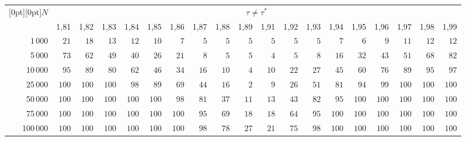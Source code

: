 \begin{table}[b]
\begin{center}
\tabcolsep=3.8pt
\begin{tabular}{|r|r|r|r|r|r|r|r|r|r|r|r|r|r|r|r|r|r|r|}
\hline
\multicolumn{1}{|c|}{\raisebox{-6pt}[0pt][0pt]{$N$}}& \multicolumn{18}{c|}{$\tau\neq\tau^*$} \\
\cline{2-19}
 & 1,81 & 1,82 & 1,83 & 1,84 & 1,85 & 1,86 & 1,87 & 1,88 & 1,89
& 1,91 & 1,92 & 1,93 & 1,94 & 1,95 & 1,96 & 1,97 & 1,98 & 1,99 \\ 
\hline
1\,000 & $21$ & $18$ & $13$ & $12$ & $10$ & $7$ & $5$ & $5$ & $5$
& $5$ & $5$ & $5$ & $7$ & $6$ & $9$ & $11$ & $12$ & $12$  \\
5\,000 & $73$ & $62$ & $49$ & $40$ & $26$ & $21$ & $8$ & $5$ & $5$
& $4$ & $5$ & $8$ & $16$ & $32$ & $43$ & $51$ & $68$ & $82$ \\
10\,000 & $95$ & $89$ & $80$ & $62$ & $46$ & $34$ & $16$ & $10$ & $4$
& $10$ & $22$ & $27$ & $45$ & $60$ & $76$ & $89$ & $95$ & $97$ \\
25\,000 & $100$ & $100$ & $100$ & $98$ & $89$ & $69$ & $44$ & $16$ & $2$
& $9$ & $26$ & $51$ & $81$ & $94$ & $99$ & $100$ & $100$ & $100$ \\
50\,000 & $100$ & $100$ & $100$ & $100$ & $100$ & $98$ & $81$ & $37$ & $11$
& $13$ & $43$ & $82$ & $95$ & $100$ & $100$ & $100$ & $100$ & $100$ \\
75\,000 & $100$ & $100$ & $100$ & $100$ & $100$ & $100$ & $95$ & $69$ & $18$
& $18$ & $64$ & $95$ & $100$ & $100$ & $100$ & $100$ & $100$ & $100$ \\
100\,000 & $100$ & $100$ & $100$ & $100$ & $100$ & $100$ & $98$ & $78$ & $27$
& $21$ & $75$ & $98$ & $100$ & $100$ & $100$ & $100$ & $100$ & $100$ \\ \hline
\end{tabular}
\end{center}
\end{table}


